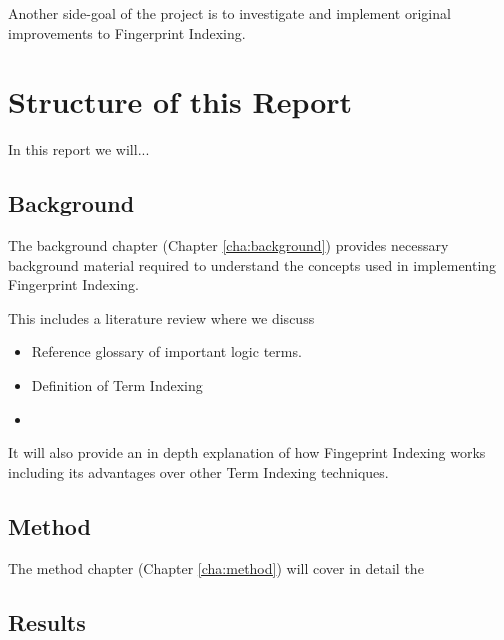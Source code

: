 Another side-goal of the project is to investigate and implement original
improvements to Fingerprint Indexing. 

\section{Structure of this Report}
\label{sec:framework}

In this report we will...

\subsection{Background}

The background chapter (Chapter \ref{cha:background}) provides necessary background material required to understand
the concepts used in implementing Fingerprint Indexing.

This includes a literature review where we discuss 
\begin{itemize}
\item Reference glossary of important logic terms.
\item Definition of Term Indexing
\item
\end{itemize}

It will also provide
an in depth explanation of how Fingeprint Indexing works including its advantages
over other Term Indexing techniques.

\subsection{Method}

The method chapter (Chapter \ref{cha:method}) will cover in detail the 

\subsection{Results}

